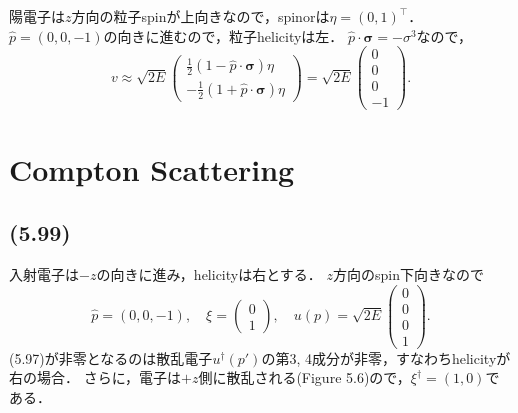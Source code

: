 陽電子は$z$方向の粒子spinが上向きなので，spinorは$\eta = (0, 1)^\top$．
$\hat{p} = (0, 0, -1)$の向きに進むので，粒子helicityは左．
$\hat{p}\cdot\boldsymbol\sigma = - \sigma^3$なので，
\[
v \approx \sqrt{2E}
\begin{pmatrix}
  \frac{1}{2} (1 - \hat{p} \cdot \boldsymbol\sigma) \eta \\[5pt]
  - \frac{1}{2} (1 + \hat{p} \cdot \boldsymbol\sigma) \eta
\end{pmatrix}
= \sqrt{2E}
\begin{pmatrix}
  0 \\
  0 \\
  0 \\
  -1
\end{pmatrix}
.
\]

\setcounter{section}{4}
\section{Compton Scattering}
\subsection{(5.99)}
入射電子は$-z$の向きに進み，helicityは右とする．
$z$方向のspin下向きなので
\[
\hat{p} = (0, 0, -1) ,\quad \xi =
\begin{pmatrix}
  0 \\
  1
\end{pmatrix}
,\quad
u(p) =
\sqrt{2E}
\begin{pmatrix}
  0 \\
  0 \\
  0 \\
  1
\end{pmatrix}
.
\]
(5.97)が非零となるのは散乱電子$u^\dagger(p')$の第3, 4成分が非零，すなわちhelicityが右の場合．
さらに，電子は$+z$側に散乱される(Figure 5.6)ので，$\xi^\dagger = (1, 0)$である．
